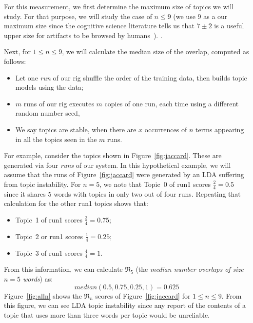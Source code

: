 \documentclass[10pt,conference]{IEEEtran}
\newcommand{\bi}{\begin{itemize}}
\newcommand{\ei}{\end{itemize}}
\theoremstyle{break}
\begin{document}
 


For this measurement, we first determine the maximum size of topics we will study. For that purpose,
we will study the case of $n \le 9$ (we use 9 as a our maximum size since the cognitive
science literature tells us that $7\pm 2$ is a useful upper size for artifacts to be browsed by humans~\cite{miller56}).
.


Next, for $1 \le n \le 9$, we will calculate the median size of the overlap,
computed as follows:
\bi
\item Let one {\em run} of our rig shuffle the order of the training data, then builds topic models using the data;
  \item $m$ runs of our rig executes $m$ copies of one run, each time using a different random number seed,
\item We say topics are stable,
when there are $x$ occurrences of  $n$ terms appearing in all the topics seen in the $m$ runs.
\ei


For example, consider the topics shown in Figure~\ref{fig:jaccard}. These are generated via four {\em runs} of our system. In this hypothetical example, we will assume that the runs of
 Figure~\ref{fig:jaccard} were generated by an LDA suffering from topic instability.
For $n=5$, we note that Topic~0 of run1 scores $\frac{2}{4}=0.5$ since it shares 5 words with topics in only two out of four runs.
Repeating that calculation for the other run1 topics shows that:
\bi
\item Topic~1 of run1 scores $\frac{3}{4}=0.75$;
\item Topic~2 or run1 scores $\frac{1}{4}=0.25$;
\item Topic~3 of run1 scores $\frac{4}{4}=1$.
  \ei
  From this information, we can calculate
  $\Re_5$  (the
  {\em median number overlaps of size $n=5$ words}) as:
  \[
   \mathit{median}(0.5, 0.75, 0.25, 1) =0.625\]
  Figure~\ref{fig:alln}
  shows the $\Re_n$ scores of 
  Figure~\ref{fig:jaccard} for $1 \le n \le 9$.  From this figure, we can see LDA topic instability
  since
  any report of the contents of a topic that uses more than three words per topic would be unreliable.
\end{document}

